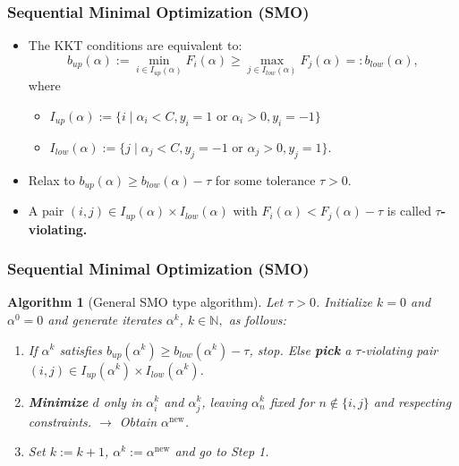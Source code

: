 \documentclass[12pt, compress]{beamer}
\newcommand{\titleC}{Sequential Minimal Optimization (SMO)}
\newtheorem{algorithm}{Algorithm}
\begin{document}
\begin{frame}
\frametitle{\titleC}
\begin{itemize}
	
	\item The KKT conditions are equivalent to:
	\begin{equation*}\label{equiv_KKT}
	b_{up}(\alpha) := \min_{i \in I_{up}(\alpha)} F_i(\alpha) \geq \max_{j \in I_{low}(\alpha)} F_j(\alpha) =: b_{low}(\alpha),
	\end{equation*}
	where \begin{itemize}
		\item $I_{up}(\alpha) := \{ i \mid  \alpha_i < C, y_i = 1 \text{ or } \alpha_i > 0, y_i = -1 \}$
		\item $I_{low}(\alpha) := \{ j \mid \alpha_j < C, y_j = -1 \text{ or } \alpha_j > 0, y_j = 1 \}$.
	
	\end{itemize}
	\item Relax to $b_{up}(\alpha) \geq b_{low}(\alpha) - \tau$ for some tolerance $\tau > 0$.
	\item A pair $(i,j) \in I_{up}(\alpha) \times I_{low}(\alpha)$ with $F_i(\alpha) < F_j(\alpha) - \tau$ is called \textbf{\alert{$\tau$-violating. }}
\end{itemize}
\end{frame}

\begin{frame}
\frametitle{\titleC}
	\begin{itemize}
		
	\end{itemize}
	\begin{algorithm}[General SMO type algorithm]\label{GSMO} Let $\tau > 0$. Initialize $k = 0 $ and $\alpha^0 = 0$ and generate iterates $\alpha^k$, $k \in \mathbb{N},$ as follows: 
		\begin{enumerate}
			\item If $\alpha^k$ satisfies $b_{up}(\alpha^k) \geq b_{low}(\alpha^k) - \tau$, stop. Else \textbf{\alert{pick}} a $\tau$-violating pair $(i,j) \in I_{up}(\alpha^k) \times I_{low}(\alpha^k)$.
			\item \textbf{\alert{Minimize}} $d$ only in $\alpha^k_i$ and $\alpha^k_j$, leaving $\alpha^k_n$ fixed for $n \notin \{i,j\}$ and respecting constraints. $\rightarrow$ Obtain \textbf{\alert{$\alpha^{\text{new}}$}}.
			\item Set $k := k+1$, $\alpha^k := \alpha^{\text{new}}$ and go to Step 1.
		\end{enumerate}
	\end{algorithm}
\end{frame}
\end{document}
